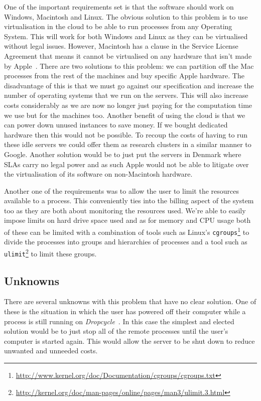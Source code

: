 \documentclass[12pt, a4paper]{article}
\def\dropcycle{\emph{Dropcycle}\ }
\begin{document}
One of the important requirements set is that the software should work on
Windows, Macintosh and Linux. The obvious solution to this problem is to use
virtualisation in the cloud to be able to run processes from any Operating
System. This will work for both Windows and Linux as they can be virtualised
without legal issues. However, Macintosh has a clause in the Service License
Agreement that means it cannot be virtualised on any hardware that isn't made
by Apple~\cite[§B, 2, iii]{LionSLA}. There are two solutions to this problem:
we can partition off the Mac processes from the rest of the machines and buy
specific Apple hardware. The disadvantage of this is that we must go against
our specification and increase the number of operating systems that we run on
the servers. This will also increase costs considerably as we are now no longer
just paying for the computation time we use but for the machines too. Another
benefit of using the cloud is that we can power down unused instances to save
money. If we bought dedicated hardware then this would not be possible. To
recoup the costs of having to run these idle servers we could offer them as
research clusters in a similar manner to Google. Another solution would be to
just put the servers in Denmark where SLAs carry no legal power and as such
Apple would not be able to litigate over the virtualisation of its software on
non-Macintosh hardware.

Another one of the requirements was to allow the user to limit the resources
available to a process. This conveniently ties into the billing aspect of the
system too as they are both about monitoring the resources used. We're able to
easily impose limits on hard drive space used and as for memory and CPU usage
both of these can be limited with a combination of tools such as Linux's
\texttt{cgroups}\footnote{\url{http://www.kernel.org/doc/Documentation/cgroups/cgroups.txt}}
to divide the processes into groups and hierarchies of processes and a tool
such as
\texttt{ulimit}\footnote{\url{http://kernel.org/doc/man-pages/online/pages/man3/ulimit.3.html}}
to limit these groups.

\subsection{Unknowns}

There are several unknowns with this problem that have no clear solution. One
of these is the situation in which the user has powered off their computer
while a process is still running on \dropcycle. In this case the simplest and
elected solution would be to just stop all of the remote processes until the
user's computer is started again. This would allow the server to be shut down
to reduce unwanted and unneeded costs.
\end{document}
